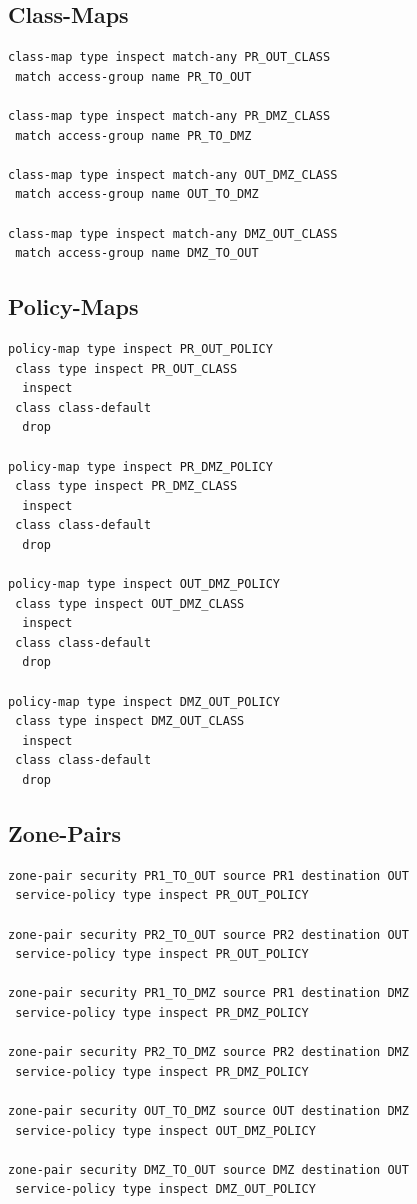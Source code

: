\documentclass[12pt]{article}
\begin{document}
\subsection{Class-Maps}

\begin{lstlisting}
class-map type inspect match-any PR_OUT_CLASS
 match access-group name PR_TO_OUT

class-map type inspect match-any PR_DMZ_CLASS
 match access-group name PR_TO_DMZ

class-map type inspect match-any OUT_DMZ_CLASS
 match access-group name OUT_TO_DMZ

class-map type inspect match-any DMZ_OUT_CLASS
 match access-group name DMZ_TO_OUT
\end{lstlisting}

\subsection{Policy-Maps}

\begin{lstlisting}
policy-map type inspect PR_OUT_POLICY
 class type inspect PR_OUT_CLASS
  inspect
 class class-default
  drop

policy-map type inspect PR_DMZ_POLICY
 class type inspect PR_DMZ_CLASS
  inspect
 class class-default
  drop

policy-map type inspect OUT_DMZ_POLICY
 class type inspect OUT_DMZ_CLASS
  inspect
 class class-default
  drop

policy-map type inspect DMZ_OUT_POLICY
 class type inspect DMZ_OUT_CLASS
  inspect
 class class-default
  drop
\end{lstlisting}

\subsection{Zone-Pairs}

\begin{lstlisting}
zone-pair security PR1_TO_OUT source PR1 destination OUT
 service-policy type inspect PR_OUT_POLICY

zone-pair security PR2_TO_OUT source PR2 destination OUT
 service-policy type inspect PR_OUT_POLICY

zone-pair security PR1_TO_DMZ source PR1 destination DMZ
 service-policy type inspect PR_DMZ_POLICY

zone-pair security PR2_TO_DMZ source PR2 destination DMZ
 service-policy type inspect PR_DMZ_POLICY

zone-pair security OUT_TO_DMZ source OUT destination DMZ
 service-policy type inspect OUT_DMZ_POLICY

zone-pair security DMZ_TO_OUT source DMZ destination OUT
 service-policy type inspect DMZ_OUT_POLICY
\end{lstlisting}
\end{document}
